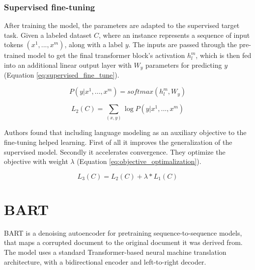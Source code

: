 \subsubsection{Supervised fine-tuning}
After training the model, the parameters are adapted to the supervised target task. Given a labeled dataset $C$, where an instance represents a sequence of input tokens $(x^1, ... , x^m)$, along with a label $y$. The inputs are passed through the pre-trained model to get the final transformer block's activation $h_l^m$, which is then fed into an additional linear output layer with $W_y$ parameters for predicting $y$ (Equation \ref{eq:supervised_fine_tune}). 

\begin{equation} \label{eq:supervised_fine_tune}
P(y|x^1, ... , x^m) = softmax(h_l^m, W_y)
\end{equation}

\begin{equation} \label{eq:supervised_maximize}
L_2(C) = \sum_{(x,y)} \log P(y|x^1, ... , x^m)
\end{equation}

Authors found that including language modeling as an auxiliary objective to the fine-tuning helped learning. First of all it improves the generalization of the supervised model. Secondly it accelerates convergence. They optimize the objective with weight $\lambda$ (Equation \ref{eq:objective_optimalization}).

\begin{equation} \label{eq:objective_optimalization}
L_3(C) = L_2(C) + \lambda * L_1(C)
\end{equation}

\section{BART} 
BART is a denoising autoencoder for pretraining sequence-to-sequence models, that maps a corrupted document to the original document it was derived from. The model uses a standard Transformer-based neural machine translation architecture, with a bidirectional encoder and left-to-right decoder.

